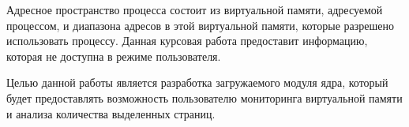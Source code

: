 \Introduction

Адресное пространство процесса состоит из виртуальной памяти, адресуемой
процессом, и диапазона адресов в этой виртуальной памяти, которые
разрешено использовать процессу. Данная курсовая работа предоставит 
информацию, которая не доступна в режиме пользователя.

Целью данной работы является разработка загружаемого модуля ядра,
который будет предоставлять возможность пользователю мониторинга
виртуальной памяти и анализа количества выделенных страниц.


